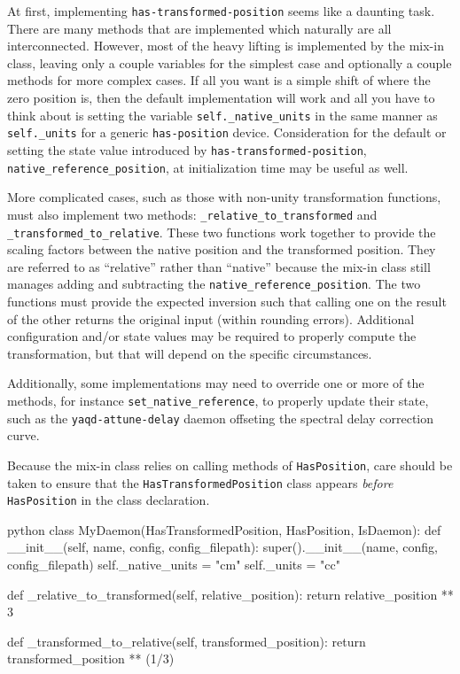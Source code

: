 At first, implementing \texttt{has-transformed-position} seems like a daunting task.
There are many methods that are implemented which naturally are all interconnected.
However, most of the heavy lifting is implemented by the mix-in class, leaving only a couple variables for the simplest case and optionally a couple methods for more complex cases.
If all you want is a simple shift of where the zero position is, then the default implementation will work and all you have to think about is setting the variable \texttt{self.\_native\_units} in the same manner as \texttt{self.\_units} for a generic \texttt{has-position} device.
Consideration for the default or setting the state value introduced by \texttt{has-transformed-position}, \texttt{native\_reference\_position}, at initialization time may be useful as well.

More complicated cases, such as those with non-unity transformation functions, must also implement two methods: \texttt{\_relative\_to\_transformed} and \texttt{\_transformed\_to\_relative}.
These two functions work together to provide the scaling factors between the native position and the transformed position.
They are referred to as ``relative'' rather than ``native'' because the mix-in class still manages adding and subtracting the \texttt{native\_reference\_position}.
The two functions must provide the expected inversion such that calling one on the result of the other returns the original input (within rounding errors).
Additional configuration and/or state values may be required to properly compute the transformation, but that will depend on the specific circumstances.

Additionally, some implementations may need to override one or more of the methods, for instance \texttt{set\_native\_reference}, to properly update their state, such as the \texttt{yaqd-attune-delay} daemon offseting the spectral delay correction curve.

Because the mix-in class relies on calling methods of \texttt{HasPosition}, care should be taken to ensure that the \texttt{HasTransformedPosition} class appears \textit{before} \texttt{HasPosition} in the class declaration.

\begin{codefragment}{python}
class MyDaemon(HasTransformedPosition, HasPosition, IsDaemon):
    def __init__(self, name, config, config_filepath):
        super().__init__(name, config, config_filepath)
        self._native_units = "cm"
        self._units = "cc"

    def _relative_to_transformed(self, relative_position):
        return relative_position ** 3

    def _transformed_to_relative(self, transformed_position):
        return transformed_position ** (1/3)
\end{codefragment}

